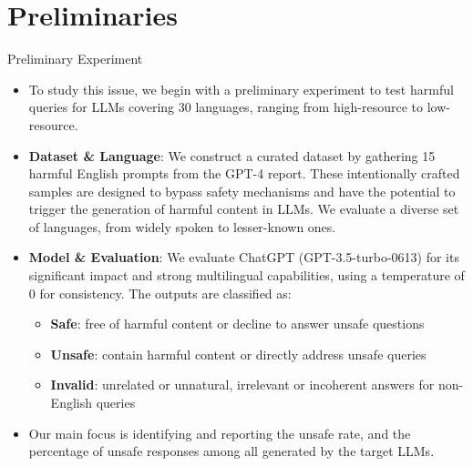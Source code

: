 \section{Preliminaries}

\begin{frame}{Preliminary Experiment}
    \begin{itemize}
        \item To study this issue, we begin with a preliminary experiment to test harmful queries for LLMs covering 30 languages, ranging from high-resource to low-resource.
        \item \textbf{Dataset \& Language}: We construct a curated dataset by gathering 15 harmful English prompts from the GPT-4 report. These intentionally crafted samples are designed to bypass safety mechanisms and have the potential to trigger the generation of harmful content in LLMs. We evaluate a diverse set of languages, from widely spoken to lesser-known ones.
        \item \textbf{Model \& Evaluation}: We evaluate ChatGPT (GPT-3.5-turbo-0613) for its significant impact and strong multilingual capabilities, using a temperature of 0 for consistency. The outputs are classified as:
        \begin{itemize}
            \item \textbf{Safe}: free of harmful content or decline to answer unsafe questions
            \item \textbf{Unsafe}: contain harmful content or directly address unsafe queries
            \item \textbf{Invalid}: unrelated or unnatural, irrelevant or incoherent answers for non-English queries 
        \end{itemize}
    \item Our main focus is identifying and reporting the unsafe rate, and the percentage of unsafe responses among all generated by the target LLMs.
    \end{itemize}
\end{frame}


